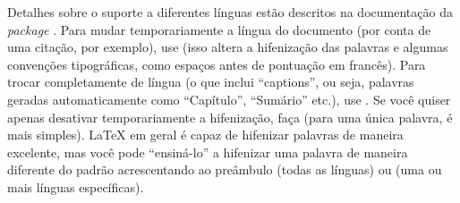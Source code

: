 Detalhes sobre o suporte a diferentes línguas estão descritos na
documentação da \textit{package} . Para mudar temporariamente
a língua do documento (por conta de uma citação, por exemplo), use
 (isso altera a hifenização
das palavras e algumas convenções tipográficas, como espaços antes de
pontuação em francês). Para trocar completamente de língua (o que
inclui ``captions'', ou seja, palavras geradas automaticamente como
``Capítulo'', ``Sumário'' etc.), use .
Se você quiser apenas desativar temporariamente a hifenização, faça
 (para uma única
palavra,  é mais simples). \LaTeX{} em
geral é capaz de hifenizar palavras de maneira excelente, mas você
pode ``ensiná-lo'' a hifenizar uma palavra de maneira diferente do
padrão acrescentando ao preâmbulo  (todas as línguas) ou  (uma ou mais línguas específicas).
